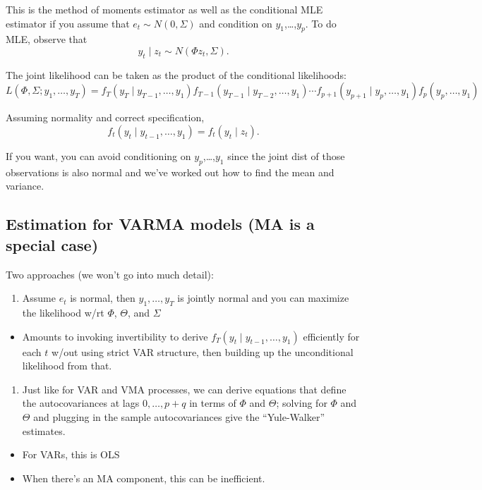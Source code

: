 This is the method of moments estimator as well as the conditional MLE
estimator if you assume that $e_t ∼ N(0, Σ)$ and
condition on $y_1$,…,$y_p$. To do MLE, observe that
\[y_t ∣ z_t ∼ N(Φ z_t, Σ).\]

The joint likelihood can be taken as the product of the conditional
likelihoods:
\[L(Φ, Σ; y_1,…,y_T) = f_T(y_T ∣ y_{T-1},…, y_1) f_{T-1}(y_{T-1} ∣
y_{T-2},…, y_1) ⋯ f_{p+1}(y_{p+1} ∣ y_p,…,y_1) f_p(y_p,…,y_1)\]

Assuming normality and correct specification,
\[f_t(y_t ∣ y_{t-1},…, y_1) = f_t(y_t ∣ z_t).\]

If you want, you can avoid conditioning on $y_p$,…,$y_1$ since the
joint dist of those observations is also normal and we've worked out
how to find the mean and variance.

\subsection{Estimation for VARMA models (MA is a special case)}

Two approaches (we won't go into much detail):

\begin{enumerate}
\item Assume $e_t$ is normal, then $y_1,…,y_T$ is jointly normal and
  you can maximize the likelihood w/rt $Φ$, $Θ$, and $Σ$
\end{enumerate}

\begin{itemize}
\item Amounts to invoking invertibility to derive $f_T(y_t ∣
  y_{t-1},…,y_1)$ efficiently for each $t$ w/out using strict VAR
  structure, then building up the unconditional likelihood from that.
\end{itemize}

\begin{enumerate}
\item Just like for VAR and VMA processes, we can derive equations
  that define the autocovariances at lags $0,…,p+q$ in terms of $Φ$
  and $Θ$; solving for $Φ$ and $Θ$ and plugging in the sample
  autocovariances give the ``Yule-Walker'' estimates.
\end{enumerate}

\begin{itemize}
\item For VARs, this is OLS
\item When there's an MA component, this can be inefficient.
\end{itemize}

